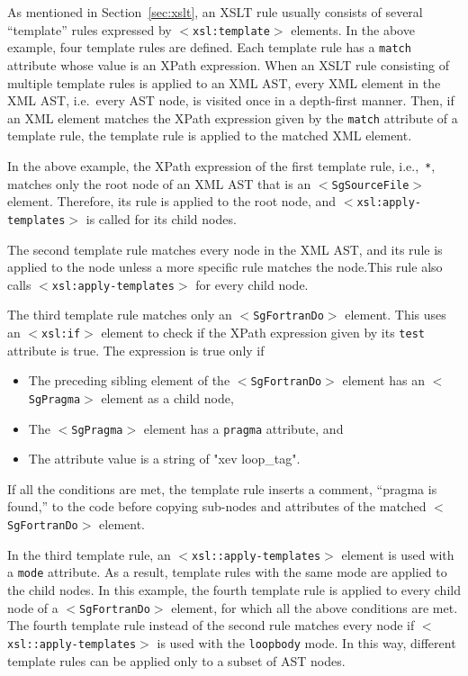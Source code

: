As mentioned in Section~\ref{sec:xslt}, an XSLT rule usually consists of
several ``template'' rules expressed by \texttt{$<$xsl:template$>$}
elements. In the above example, four template rules are defined. Each
template rule has a \texttt{match} attribute whose value is an XPath
expression. When an XSLT rule consisting of multiple template rules is
applied to an XML AST, every XML element in the XML AST, i.e.~every AST
node, is visited once in a depth-first manner. Then, if an XML element
matches the XPath expression given by the \texttt{match} attribute of a
template rule, the template rule is applied to the matched XML element.

In the above example, the XPath expression of the first template rule,
i.e.,~\texttt{*}, matches only the root node of an XML AST that is an
\texttt{$<$SgSourceFile$>$} element. Therefore, its rule is applied to
the root node, and \texttt{$<$xsl:apply-templates$>$} is called for
its child nodes.

The second template rule matches every node in the XML AST, and its rule
is applied to the node unless a more specific rule matches the node.This
rule also calls \texttt{$<$xsl:apply-templates$>$} for every child
node.

The third template rule matches only an \texttt{$<$SgFortranDo$>$}
element. This uses an \texttt{$<$xsl:if$>$} element to check if the
XPath expression given by its \texttt{test} attribute is true. The
expression is true only if
\begin{itemize}
 \item The preceding sibling element of the \texttt{$<$SgFortranDo$>$}
       element has an \texttt{$<$SgPragma$>$} element as a child node,
 \item The \texttt{$<$SgPragma$>$} element has a \texttt{pragma}
       attribute, and
 \item The attribute value is a string of "xev loop\_tag".
\end{itemize}
If all the conditions are met, the template rule inserts a comment,
``pragma is found,'' to the code before copying sub-nodes and attributes
of the matched \texttt{$<$SgFortranDo$>$} element.

In the third template rule, an \texttt{$<$xsl::apply-templates$>$}
element is used with a \texttt{mode} attribute. As a result, template
rules with the same mode are applied to the child nodes. In this
example, the fourth template rule is applied to every child node of a
\texttt{$<$SgFortranDo$>$} element, for which all the above conditions
are met. The fourth template rule instead of the second rule matches
every node if \texttt{$<$xsl::apply-templates$>$} is used with the
\texttt{loopbody} mode. In this way, different template rules can be
applied only to a subset of AST nodes.


